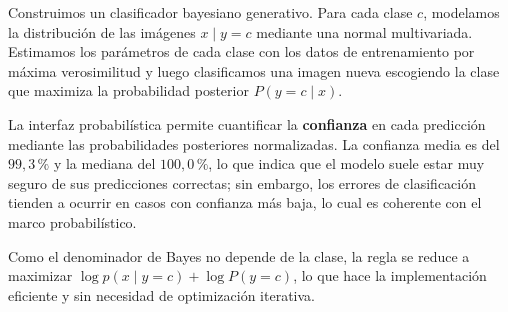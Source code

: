 \documentclass[11pt,a4paper]{article}
\begin{document}
Construimos un clasificador bayesiano generativo. Para cada clase $c$,
modelamos la distribuci\'on de las im\'agenes $x\mid y=c$ mediante una normal
multivariada. Estimamos los par\'ametros de cada clase con los datos de
entrenamiento por m\'axima verosimilitud y luego clasificamos una imagen nueva
escogiendo la clase que maximiza la probabilidad posterior $P(y=c\mid x)$.

La interfaz probabil\'istica permite cuantificar la \textbf{confianza} en cada
predicci\'on mediante las probabilidades posteriores normalizadas. La
confianza media es del $99{,}3\,\%$ y la mediana del $100{,}0\,\%$, lo que
indica que el modelo suele estar muy seguro de sus predicciones correctas;
sin embargo, los errores de clasificaci\'on tienden a ocurrir en casos con
confianza m\'as baja, lo cual es coherente con el marco probabil\'istico.

Como el denominador de Bayes no depende de la clase, la regla se reduce a
maximizar $\log p(x\mid y=c)+\log P(y=c)$, lo que hace la implementaci\'on
eficiente y sin necesidad de optimizaci\'on iterativa.
\end{document}
